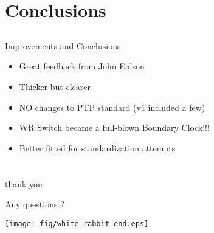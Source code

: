 \documentclass[compress,red]{beamer}
\begin{document}
\section{Conclusions}
\subsection{}
\begin{frame}{Improvements and Conclusions}

\begin{itemize}
  \item Great feedback from John Eidson
  \item Thicker but clearer
  \item NO changes to PTP standard (v1 included a few)
  \item WR Switch became a full-blown Boundary Clock!!!
  \item Better fitted for standardization attempts
\end{itemize}

\end{frame}
\section{}
\begin{frame}{thank you}

    \begin{center}
    Any questions ?
    \end{center}

    
    \begin{center}
    \texttt{[image: fig/white\_rabbit\_end.eps]}
    \end{center}

\end{frame}
\end{document}
